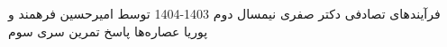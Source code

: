 \documentclass[11pt, a4, twoside]{article}
\begin{document}
	\pagestyle{empty}
	\heading
	{فرآیندهای تصادفی}
	{دکتر صفری}
	{نیمسال دوم 1403-1404}
    {توسط امیرحسین فرهمند و پوریا عصاره‌ها}
    {پاسخ تمرین سری سوم}
	\begin{problem}
        
	\end{problem}
\end{document}
